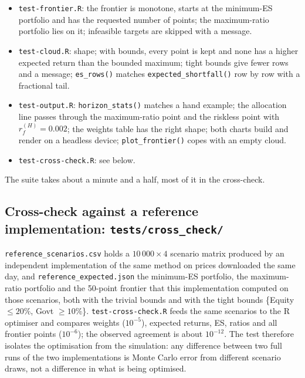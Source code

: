 \documentclass[11pt,a4paper]{article}
\newcommand{\code}[1]{\texttt{#1}}
\newcommand{\file}[1]{\texttt{#1}}
\theoremstyle{plain}
\theoremstyle{remark}
\begin{document}
\begin{itemize}[nosep]
        or without bounds and with $r_f^{(H)} = 0.002$, has a higher ratio
        than the maximum-ratio portfolio; a
        target return is honoured and costs ES; the bounds are honoured; a
        riskless asset is chosen fully; the maximum-ratio preconditions
        raise on data built to violate them; \code{max\_return()} respects
        the bounds.
  \item \file{test-frontier.R}: the frontier is monotone, starts at the
        minimum-ES portfolio and has the requested number of points; the
        maximum-ratio portfolio lies on it; infeasible targets are skipped
        with a message.
  \item \file{test-cloud.R}: shape; with bounds, every point is kept and
        none has a higher expected return than the bounded maximum; tight bounds
        give fewer rows and a message; \code{es\_rows()} matches
        \code{expected\_shortfall()} row by row with a fractional tail.
  \item \file{test-output.R}: \code{horizon\_stats()} matches a hand example;
        the allocation line passes through the maximum-ratio point and the
        riskless point with $r_f^{(H)} = 0.002$; the weights table has the
        right shape; both charts build and render on a headless device;
        \code{plot\_frontier()} copes with an empty cloud.
  \item \file{test-cross-check.R}: see below.
\end{itemize}
The suite takes about a minute and a half, most of it in the cross-check.

\subsection{Cross-check against a reference implementation:
\file{tests/cross\_check/}}

\file{reference\_scenarios.csv} holds a $10\,000\times 4$ scenario matrix
produced by an independent implementation of the same method on prices
downloaded the same day, and \file{reference\_expected.json} the minimum-ES portfolio, the
maximum-ratio portfolio and the 50-point frontier that this implementation
computed on those scenarios, both with the trivial bounds and with the
tight bounds \{Equity $\le 20\%$, Govt $\ge 10\%$\}. \file{test-cross-check.R}
feeds the same scenarios to the R optimiser and compares weights
($10^{-5}$), expected returns, ES, ratios and all frontier points
($10^{-6}$); the observed agreement is about $10^{-12}$. The test therefore
isolates the optimisation from the simulation: any difference between two
full runs of the two implementations is Monte Carlo error from different
scenario draws, not a difference in what is being optimised.
\end{document}
